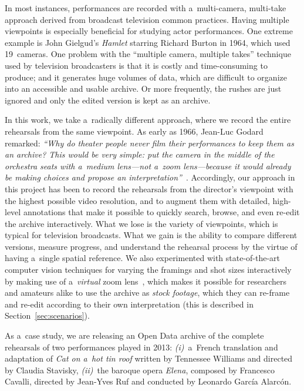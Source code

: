 \documentclass[conference]{IEEEtran}
\begin{document}

In most instances, performances are recorded with a~multi-camera, multi-take approach derived from broadcast television common practices. Having multiple viewpoints is especially beneficial for studying actor performances.  One extreme example is John Gielgud's  \emph{Hamlet} starring Richard Burton in 1964,  which used 19~cameras.  One problem with the ``multiple camera, multiple takes'' technique used by television broadcasters  is that it is costly and time-consuming to produce; and it generates huge volumes of data, which are  difficult to organize into an accessible and usable archive. Or more frequently, the rushes  are just ignored and only the edited version is kept as an archive. 

In this work, we take a~radically different approach, where we record the entire rehearsals from the same viewpoint.  As early as 1966, Jean-Luc Godard remarked: {\em ``Why do theater people never film their performances to keep  them as an archive? This would be very simple: put the camera in the middle of the orchestra seats with a~medium lens---not a~zoom lens---because it would already be making choices and propose an interpretation''}~\cite{Godard66}. Accordingly, our approach in this project has been to record the rehearsals from the director's viewpoint  with the highest possible video resolution, and to augment them with detailed, high-level  annotations that make it possible to quickly  search, browse, and even re-edit the archive interactively. What we lose is the variety of viewpoints, which is typical for television broadcasts. What we gain is the ability to compare different versions, measure progress, and understand the rehearsal process by the virtue of having a~single spatial reference. We also experimented with state-of-the-art computer vision techniques for varying the framings and shot sizes interactively  by making use of a~{\em virtual}  zoom lens~\cite{Gandhi14,Gandhi15}, which makes it possible for researchers and amateurs alike to use the archive as {\em stock footage}, which they can re-frame and re-edit according to their own interpretation (this is described in Section~\ref{sec:scenarios}). 

As a~case study, we are releasing an Open Data archive of the complete rehearsals of two performances played in 2013: \emph{(i)}~a~French translation and adaptation of \emph{Cat on a~hot tin roof} written by Tennessee Williams and directed by Claudia Stavisky, \emph{(ii)}~the baroque opera \emph{Elena}, composed by Francesco Cavalli, directed by Jean-Yves Ruf and conducted by Leonardo García Alarcón.
\end{document}

